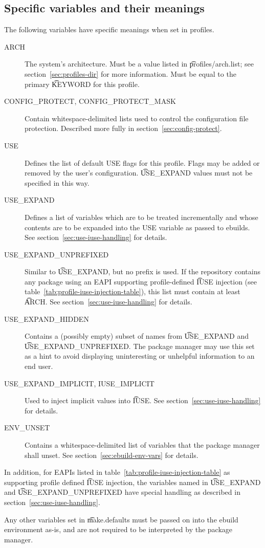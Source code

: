 \subsection{Specific variables and their meanings}
The following variables have specific meanings when set in profiles.
\begin{description}
\item[ARCH] The system's architecture. Must be a value listed in \t{profiles/arch.list}; see
    section~\ref{sec:profiles-dir} for more information. Must be equal to the primary \t{KEYWORD}
    for this profile.
\item[CONFIG_PROTECT, CONFIG_PROTECT_MASK] Contain whitespace-delimited lists used to control the
    configuration file protection. Described more fully in section~\ref{sec:config-protect}.
\item[USE] Defines the list of default USE flags for this profile. Flags may be added or removed by
    the user's configuration. \t{USE_EXPAND} values must not be specified in this way.
\item[USE_EXPAND] Defines a list of variables which are to be treated incrementally and whose
    contents are to be expanded into the USE variable as passed to ebuilds. See
    section~\ref{sec:use-iuse-handling} for details.
\item[USE_EXPAND_UNPREFIXED] Similar to \t{USE_EXPAND}, but no prefix is used. If the repository
    contains any package using an EAPI supporting profile-defined \t{IUSE} injection (see
    table~\ref{tab:profile-iuse-injection-table}), this list must contain at least \t{ARCH}\@.
    See section~\ref{sec:use-iuse-handling} for details.
\item[USE_EXPAND_HIDDEN] Contains a (possibly empty) subset of names from \t{USE_EXPAND} and
    \t{USE_EXPAND_UNPREFIXED}\@. The package manager may use this set as a hint to avoid
    displaying uninteresting or unhelpful information to an end user.
\item[USE_EXPAND_IMPLICIT, IUSE_IMPLICIT] Used to inject implicit values into \t{IUSE}\@. See
    section~\ref{sec:use-iuse-handling} for details.
\item[ENV_UNSET] Contains a whitespace-delimited list of variables that the package manager shall
    unset. See section~\ref{sec:ebuild-env-vars} for details.
\end{description}

In addition, for EAPIs listed in table~\ref{tab:profile-iuse-injection-table} as supporting profile
defined \t{IUSE} injection, the variables named in \t{USE_EXPAND} and \t{USE_EXPAND_UNPREFIXED}
have special handling as described in section~\ref{sec:use-iuse-handling}.

Any other variables set in \t{make.defaults} must be passed on into the ebuild environment as-is,
and are not required to be interpreted by the package manager.


